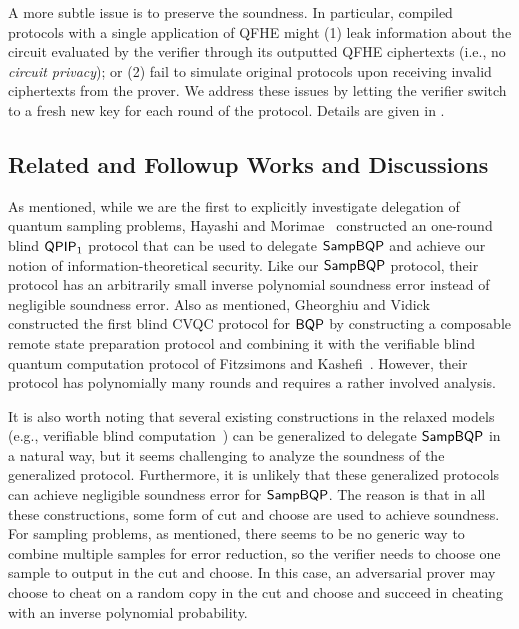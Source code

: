 A more subtle issue is to preserve the soundness.
In particular, compiled protocols with a single application of QFHE might (1) leak information about the circuit evaluated by the verifier through its outputted QFHE ciphertexts (i.e., no \emph{circuit privacy});
or (2) fail to simulate original protocols upon receiving invalid ciphertexts from the prover.
We address these issues by letting the verifier switch to a fresh new key for each round of the protocol. 
Details are given in .

\vspace{-3pt}

\subsection{Related and Followup Works and Discussions}  \label{subsec:discussion}

As mentioned, while we are the first to explicitly investigate delegation of quantum sampling problems, Hayashi and Morimae~\cite{hayashi2015verifiable} constructed an one-round blind $\operatorname{\mathsf{QPIP}}_1$ protocol that can be used to delegate $\operatorname{\mathsf{SampBQP}}$ and achieve our notion of information-theoretical security. Like our $\operatorname{\mathsf{SampBQP}}$ protocol, their protocol has an arbitrarily small inverse polynomial soundness error instead of negligible soundness error. Also as mentioned,  Gheorghiu and Vidick~\cite{FOCS:GheVid19} constructed the first blind CVQC protocol for $\operatorname{\mathsf{BQP}}$ by constructing a composable remote state preparation protocol and combining it with the verifiable blind quantum computation protocol of Fitzsimons and Kashefi~\cite{FK17}. However, their protocol has polynomially many rounds  and requires a rather involved analysis. 

It is also worth noting that several existing constructions in the relaxed models (e.g., verifiable blind computation~\cite{FK17}) can be generalized to delegate $\operatorname{\mathsf{SampBQP}}$ in a natural way, but it seems challenging to analyze the soundness of the generalized protocol. Furthermore, it is unlikely that these generalized protocols can achieve negligible soundness error for $\operatorname{\mathsf{SampBQP}}$. The reason is that in all these constructions, some form of cut and choose are used to achieve soundness.
For sampling problems, as mentioned, there seems to be no generic way to combine multiple samples for error reduction, so the verifier needs to choose one sample to output in the cut and choose. In this case, an adversarial prover may choose to cheat on a random copy in the cut and choose and succeed in cheating with an inverse polynomial probability. 

